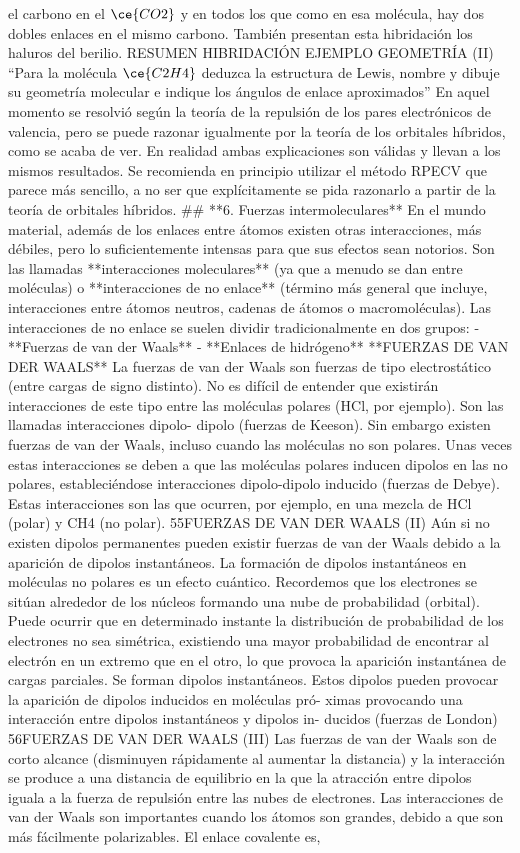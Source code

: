 \documentclass[tikz,border=2mm]{standalone}
\begin{document}
el carbono en el $\ce{CO2}$ y en todos los que como en esa molécula, hay dos dobles enlaces en el mismo carbono. También presentan esta hibridación los haluros del berilio. RESUMEN HIBRIDACIÓN EJEMPLO GEOMETRÍA (II) “Para la molécula $\ce{C2H4}$ deduzca la estructura de Lewis, nombre y dibuje su geometría molecular e indique los ángulos de enlace aproximados” En aquel momento se resolvió según la teoría de la repulsión de los pares electrónicos de valencia, pero se puede razonar igualmente por la teoría de los orbitales híbridos, como se acaba de ver. En realidad ambas explicaciones son válidas y llevan a los mismos resultados. Se recomienda en principio utilizar el método RPECV que parece más sencillo, a no ser que explícitamente se pida razonarlo a partir de la teoría de orbitales híbridos. ## **6. Fuerzas intermoleculares** En el mundo material, además de los enlaces entre átomos existen otras interacciones, más débiles, pero lo suficientemente intensas para que sus efectos sean notorios. Son las llamadas **interacciones moleculares** (ya que a menudo se dan entre moléculas) o **interacciones de no enlace** (término más general que incluye, interacciones entre átomos neutros, cadenas de átomos o macromoléculas). Las interacciones de no enlace se suelen dividir tradicionalmente en dos grupos: - **Fuerzas de van der Waals** - **Enlaces de hidrógeno** **FUERZAS DE VAN DER WAALS** La fuerzas de van der Waals son fuerzas de tipo electrostático (entre cargas de signo distinto). No es difícil de entender que existirán interacciones de este tipo entre las moléculas polares (HCl, por ejemplo). Son las llamadas interacciones dipolo- dipolo (fuerzas de Keeson). Sin embargo existen fuerzas de van der Waals, incluso cuando las moléculas no son polares. Unas veces estas interacciones se deben a que las moléculas polares inducen dipolos en las no polares, estableciéndose interacciones dipolo-dipolo inducido (fuerzas de Debye). Estas interacciones son las que ocurren, por ejemplo, en una mezcla de HCl (polar) y CH4 (no polar). 55FUERZAS DE VAN DER WAALS (II) Aún si no existen dipolos permanentes pueden existir fuerzas de van der Waals debido a la aparición de dipolos instantáneos. La formación de dipolos instantáneos en moléculas no polares es un efecto cuántico. Recordemos que los electrones se sitúan alrededor de los núcleos formando una nube de probabilidad (orbital). Puede ocurrir que en determinado instante la distribución de probabilidad de los electrones no sea simétrica, existiendo una mayor probabilidad de encontrar al electrón en un extremo que en el otro, lo que provoca la aparición instantánea de cargas parciales. Se forman dipolos instantáneos. Estos dipolos pueden provocar la aparición de dipolos inducidos en moléculas pró- ximas provocando una interacción entre dipolos instantáneos y dipolos in- ducidos (fuerzas de London) 56FUERZAS DE VAN DER WAALS (III) Las fuerzas de van der Waals son de corto alcance (disminuyen rápidamente al aumentar la distancia) y la interacción se produce a una distancia de equilibrio en la que la atracción entre dipolos iguala a la fuerza de repulsión entre las nubes de electrones. Las interacciones de van der Waals son importantes cuando los átomos son grandes, debido a que son más fácilmente polarizables. El enlace covalente es, 
\end{document}
